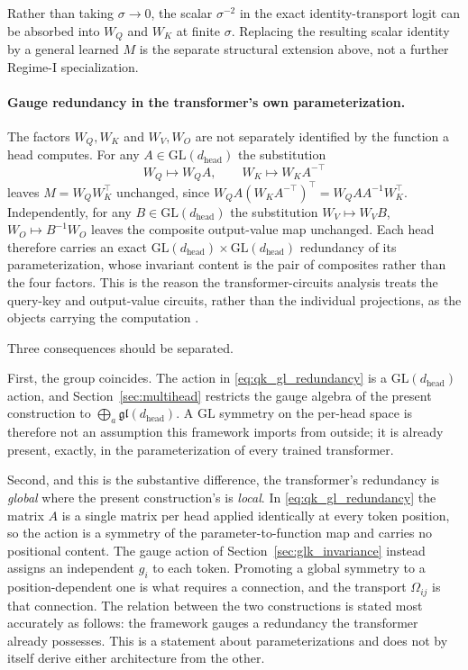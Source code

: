 \documentclass[twoside,11pt]{article}
\begin{document}
Rather than taking $\sigma \to 0$, the scalar $\sigma^{-2}$ in the exact identity-transport logit can be absorbed into $W_Q$ and $W_K$ at finite $\sigma$. Replacing the resulting scalar identity by a general learned $M$ is the separate structural extension above, not a further Regime-I specialization.

\paragraph{Gauge redundancy in the transformer's own parameterization.}
The factors $W_Q, W_K$ and $W_V, W_O$ are not separately identified by the function a head computes. For any $A \in \mathrm{GL}(d_{\text{head}})$ the substitution
%
\begin{equation}
W_Q \mapsto W_Q A, \qquad W_K \mapsto W_K A^{-\top}
\label{eq:qk_gl_redundancy}
\end{equation}
%
leaves $M = W_QW_K^\top$ unchanged, since $W_QA(W_KA^{-\top})^\top = W_QAA^{-1}W_K^\top$. Independently, for any $B \in \mathrm{GL}(d_{\text{head}})$ the substitution $W_V \mapsto W_VB$, $W_O \mapsto B^{-1}W_O$ leaves the composite output-value map unchanged. Each head therefore carries an exact $\mathrm{GL}(d_{\text{head}}) \times \mathrm{GL}(d_{\text{head}})$ redundancy of its parameterization, whose invariant content is the pair of composites rather than the four factors. This is the reason the transformer-circuits analysis treats the query-key and output-value circuits, rather than the individual projections, as the objects carrying the computation \citep{elhage2021mathematical}.

Three consequences should be separated.

First, the group coincides. The action in \eqref{eq:qk_gl_redundancy} is a $\mathrm{GL}(d_{\text{head}})$ action, and Section~\ref{sec:multihead} restricts the gauge algebra of the present construction to $\bigoplus_a \mathfrak{gl}(d_{\text{head}})$. A $\mathrm{GL}$ symmetry on the per-head space is therefore not an assumption this framework imports from outside; it is already present, exactly, in the parameterization of every trained transformer.

Second, and this is the substantive difference, the transformer's redundancy is \emph{global} where the present construction's is \emph{local}. In \eqref{eq:qk_gl_redundancy} the matrix $A$ is a single matrix per head applied identically at every token position, so the action is a symmetry of the parameter-to-function map and carries no positional content. The gauge action of Section~\ref{sec:glk_invariance} instead assigns an independent $g_i$ to each token. Promoting a global symmetry to a position-dependent one is what requires a connection, and the transport $\Omega_{ij}$ is that connection. The relation between the two constructions is stated most accurately as follows: the framework gauges a redundancy the transformer already possesses. This is a statement about parameterizations and does not by itself derive either architecture from the other.
\end{document}
